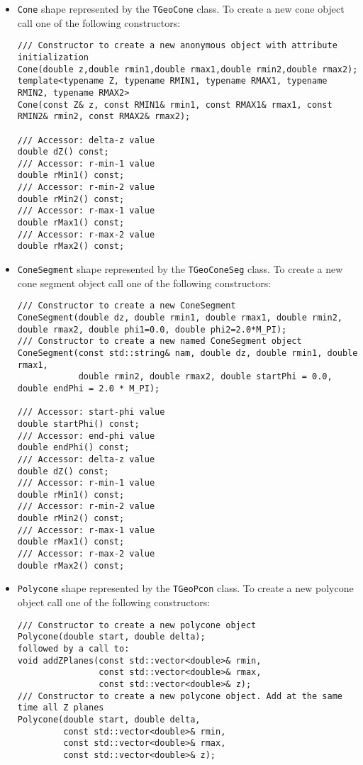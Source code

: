 \begin{itemize}
\item \texttt{Cone}  shape represented by the \texttt{TGeoCone} class. To create a new cone object call one of the following constructors:
\begin{verbatim}
/// Constructor to create a new anonymous object with attribute initialization
Cone(double z,double rmin1,double rmax1,double rmin2,double rmax2);
template<typename Z, typename RMIN1, typename RMAX1, typename RMIN2, typename RMAX2>
Cone(const Z& z, const RMIN1& rmin1, const RMAX1& rmax1, const RMIN2& rmin2, const RMAX2& rmax2);

/// Accessor: delta-z value
double dZ() const;
/// Accessor: r-min-1 value
double rMin1() const;
/// Accessor: r-min-2 value
double rMin2() const;
/// Accessor: r-max-1 value
double rMax1() const;
/// Accessor: r-max-2 value
double rMax2() const;
\end{verbatim}

\item \texttt{ConeSegment} shape represented by the \texttt{TGeoConeSeg} class. To create a new cone segment object call one of the following constructors:
\begin{verbatim}
/// Constructor to create a new ConeSegment
ConeSegment(double dz, double rmin1, double rmax1, double rmin2, double rmax2, double phi1=0.0, double phi2=2.0*M_PI);
/// Constructor to create a new named ConeSegment object
ConeSegment(const std::string& nam, double dz, double rmin1, double rmax1,
            double rmin2, double rmax2, double startPhi = 0.0, double endPhi = 2.0 * M_PI);

/// Accessor: start-phi value
double startPhi() const;
/// Accessor: end-phi value
double endPhi() const;
/// Accessor: delta-z value
double dZ() const;
/// Accessor: r-min-1 value
double rMin1() const;
/// Accessor: r-min-2 value
double rMin2() const;
/// Accessor: r-max-1 value
double rMax1() const;
/// Accessor: r-max-2 value
double rMax2() const;
\end{verbatim}

\item \texttt{Polycone} shape represented by the \texttt{TGeoPcon} class. To create a new polycone object call one of the following constructors:
\begin{verbatim}
/// Constructor to create a new polycone object
Polycone(double start, double delta);
followed by a call to:
void addZPlanes(const std::vector<double>& rmin, 
                const std::vector<double>& rmax,
                const std::vector<double>& z);
/// Constructor to create a new polycone object. Add at the same time all Z planes
Polycone(double start, double delta, 
         const std::vector<double>& rmin, 
         const std::vector<double>& rmax, 
         const std::vector<double>& z);
         

\end{verbatim}
\end{itemize}
